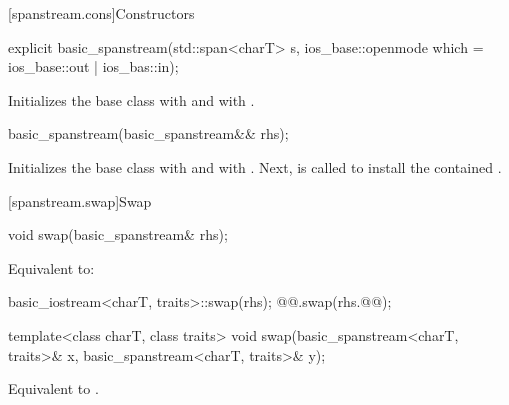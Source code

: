 [spanstream.cons]{Constructors}

%
\begin{itemdecl}
explicit basic_spanstream(std::span<charT> s,
                          ios_base::openmode which = ios_base::out | ios_bas::in);
\end{itemdecl}

\begin{itemdescr}
\pnum
\effects
Initializes the base class with
and  with
.
\end{itemdescr}

%
\begin{itemdecl}
basic_spanstream(basic_spanstream&& rhs);
\end{itemdecl}

\begin{itemdescr}
\pnum
\effects
Initializes the base class with 
and  with .
Next, 
is called to install the contained .
\end{itemdescr}

[spanstream.swap]{Swap}

%
\begin{itemdecl}
void swap(basic_spanstream& rhs);
\end{itemdecl}

\begin{itemdescr}
\pnum
\effects
Equivalent to:
\begin{codeblock}
basic_iostream<charT, traits>::swap(rhs);
@@.swap(rhs.@@);
\end{codeblock}
\end{itemdescr}

%
\begin{itemdecl}
template<class charT, class traits>
  void swap(basic_spanstream<charT, traits>& x, basic_spanstream<charT, traits>& y);
\end{itemdecl}

\begin{itemdescr}
\pnum
\effects
Equivalent to .
\end{itemdescr}

